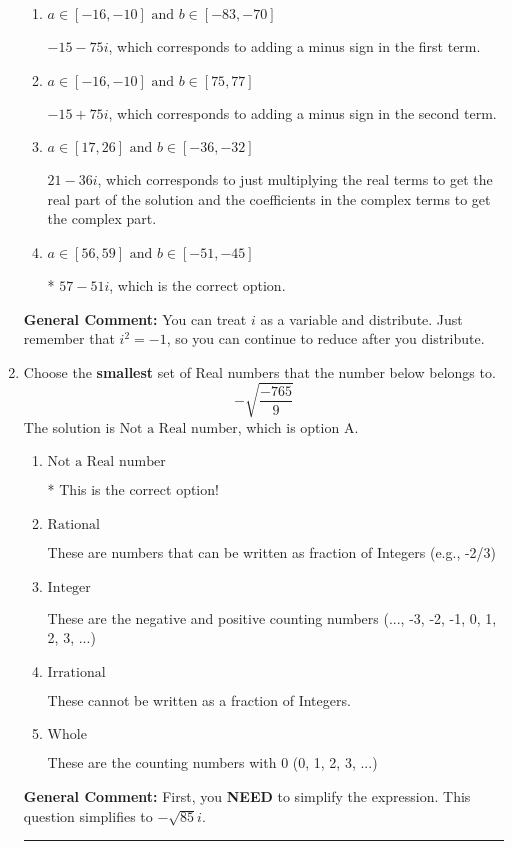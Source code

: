 \documentclass{extbook}[14pt]
\newcommand{\litem}[1]{\item #1

\rule{\textwidth}{0.4pt}}
\begin{document}
\begin{enumerate}
{\begin{enumerate}[label=\Alph*.]
 $57 + 51 i$, which corresponds to adding a minus sign in both terms.
\item \( a \in [-16, -10] \text{ and } b \in [-83, -70] \)

 $-15 - 75 i$, which corresponds to adding a minus sign in the first term.
\item \( a \in [-16, -10] \text{ and } b \in [75, 77] \)

 $-15 + 75 i$, which corresponds to adding a minus sign in the second term.
\item \( a \in [17, 26] \text{ and } b \in [-36, -32] \)

 $21 - 36 i$, which corresponds to just multiplying the real terms to get the real part of the solution and the coefficients in the complex terms to get the complex part.
\item \( a \in [56, 59] \text{ and } b \in [-51, -45] \)

* $57 - 51 i$, which is the correct option.
\end{enumerate}

\textbf{General Comment:} You can treat $i$ as a variable and distribute. Just remember that $i^2=-1$, so you can continue to reduce after you distribute.
}
\litem{
Choose the \textbf{smallest} set of Real numbers that the number below belongs to.
\[ -\sqrt{\frac{-765}{9}} \]The solution is \( \text{Not a Real number} \), which is option A.\begin{enumerate}[label=\Alph*.]
\item \( \text{Not a Real number} \)

* This is the correct option!
\item \( \text{Rational} \)

These are numbers that can be written as fraction of Integers (e.g., -2/3)
\item \( \text{Integer} \)

These are the negative and positive counting numbers (..., -3, -2, -1, 0, 1, 2, 3, ...)
\item \( \text{Irrational} \)

These cannot be written as a fraction of Integers.
\item \( \text{Whole} \)

These are the counting numbers with 0 (0, 1, 2, 3, ...)
\end{enumerate}

\textbf{General Comment:} First, you \textbf{NEED} to simplify the expression. This question simplifies to $-\sqrt{85} i$. 
 
}
\end{enumerate}
\end{document}
